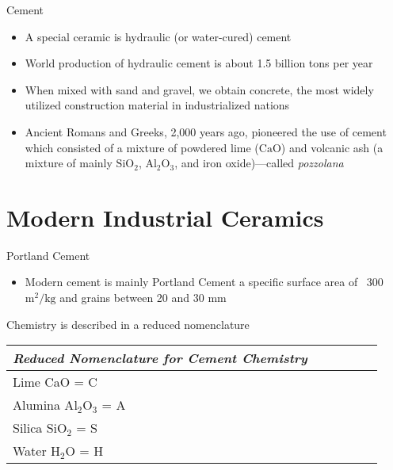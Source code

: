 \documentclass{libs/XJTLU_format}
\begin{document}
\begin{frame}{Cement}
\begin{itemize}
    \item A special ceramic is hydraulic (or water-cured) cement \pause
    \item World production of hydraulic cement is about 1.5 billion tons per year \pause
    \item When mixed with sand and gravel, we obtain concrete, the most widely utilized construction material in industrialized nations
    \item Ancient Romans and Greeks, 2,000 years ago, pioneered the use of cement which consisted of a mixture of powdered lime ($\mathrm{CaO}$) and volcanic ash (a mixture of mainly $\mathrm{SiO_2}$, $\mathrm{Al_2O_3}$, and iron oxide)—called \emph{pozzolana}
\end{itemize}
    
\end{frame}

\section{Modern Industrial Ceramics}

\begin{frame}{Portland Cement}
\begin{itemize}
    \item Modern cement is mainly Portland Cement
    \have a specific surface area of ~300 $\mathrm{m^{2}/kg}$ and grains between 20 and 30 $\mathrm{mm}$
\end{itemize}
\newline

Chemistry is described in a reduced nomenclature
\newline \pause

\centering
\vspace{1em}
\begin{tabular}{p{} @{} *5l @{}} \toprule
\emph{Reduced Nomenclature for Cement Chemistry} &&&  \\\midrule
 Lime CaO = C \\
 Alumina $\mathrm{Al_2O_3}$ = A \\ 
 Silica $\mathrm{SiO_2}$ = S \\ 
 Water $\mathrm{H_2O}$ = H\\\bottomrule
\end{tabular}
\end{frame}
\end{document}
